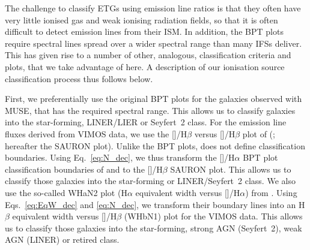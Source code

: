 \documentclass[a4paper,fleqn,usenatbib]{mnras}
\begin{document}
The challenge to classify ETGs using emission line ratios is that they
often have very little ionised gas and weak ionising radiation fields,
so that it is often difficult to detect emission lines from their
ISM. In addition, the BPT plots require spectral lines spread over a
wider spectral range than many IFSs deliver. This has given rise to a
number of other, analogous, classification criteria and plots, that we
take advantage of here. A description of our ionisation source
classification process thus follows below.

First, we preferentially use the original BPT plots for the galaxies
observed with MUSE, that has the required spectral range. This allows
us to classify galaxies into the star-forming, LINER/LIER or Seyfert~2
class. For the emission line fluxes derived from VIMOS data, we use
the []/H$\beta$ versus []/H$\beta$ plot of
\citeauthor{Sarzi2010} (\citeyear{Sarzi2010}; hereafter the SAURON
plot). Unlike the BPT plots, \citet{Sarzi2010} does not define
classification boundaries. Using Eq.~\ref{eq:N_dec}, we thus transform
the []/H$\alpha$ BPT plot classification boundaries of
\citet{Kewley2001} and \citet{Kauffmann2003a} to the
[]/H$\beta$ SAURON plot. This allows us to classify those
galaxies into the star-forming or LINER/Seyfert~2 class. We also use
the so-called WHaN2 plot (H$\alpha$ equivalent width versus
[]/H$\alpha$) from \citet{CidFernandes2011}. Using
Eqs.~\ref{eq:EqW_dec} and \ref{eq:N_dec}, we transform their boundary
lines into an H$\beta$ equivalent width versus []/H$\beta$
(WHbN1) plot for the VIMOS data. This allows us to classify those
galaxies into the star-forming, strong AGN (Seyfert~2), weak AGN
(LINER) or retired class.
\end{document}
